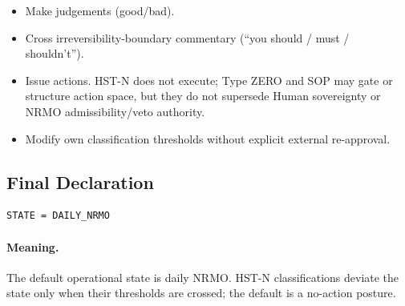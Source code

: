 \begin{itemize}
\item Make judgements (good/bad).
\item Cross irreversibility-boundary commentary
(``you should / must / shouldn't'').
\item Issue actions. HST-N does not execute; Type ZERO and SOP may gate or
structure action space, but they do not supersede Human sovereignty or NRMO
admissibility/veto authority.
\item Modify own classification thresholds without explicit external
re-approval.
\end{itemize}

\subsection{Final Declaration}
\label{sec:hstn-final-declaration-c2}

\begin{lstlisting}[basicstyle=\ttfamily\small,frame=single]
STATE = DAILY_NRMO
\end{lstlisting}

\paragraph{Meaning.}
The default operational state is daily NRMO. HST-N classifications
deviate the state only when their thresholds are crossed; the
default is a no-action posture.

